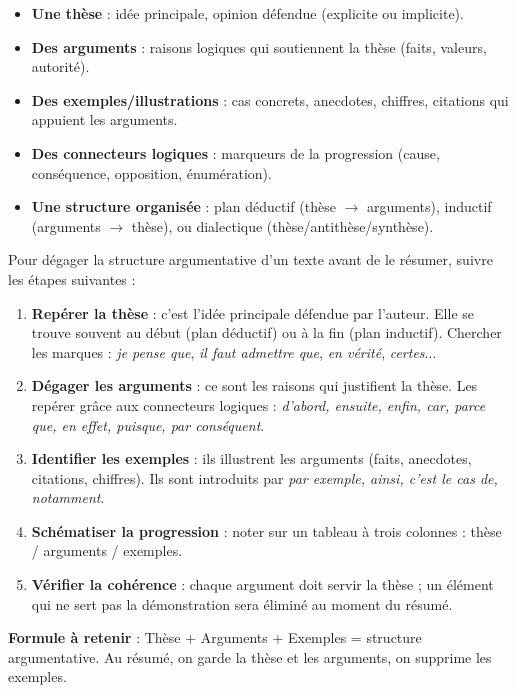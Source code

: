 \documentclass[11pt]{article}
\begin{document}
\begin{propriete}
\begin{itemize}
\item \textbf{Une thèse} : idée principale, opinion défendue (explicite ou implicite).
\item \textbf{Des arguments} : raisons logiques qui soutiennent la thèse (faits, valeurs, autorité).
\item \textbf{Des exemples/illustrations} : cas concrets, anecdotes, chiffres, citations qui appuient les arguments.
\item \textbf{Des connecteurs logiques} : marqueurs de la progression (cause, conséquence, opposition, énumération).
\item \textbf{Une structure organisée} : plan déductif (thèse $\rightarrow$ arguments), inductif (arguments $\rightarrow$ thèse), ou dialectique (thèse/antithèse/synthèse).
\end{itemize}
\end{propriete}

\begin{methode}
Pour dégager la structure argumentative d'un texte avant de le résumer, suivre les étapes suivantes :
\begin{enumerate}
\item \textbf{Repérer la thèse} : c'est l'idée principale défendue par l'auteur. Elle se trouve souvent au début (plan déductif) ou à la fin (plan inductif). Chercher les marques : \emph{je pense que}, \emph{il faut admettre que}, \emph{en vérité}, \emph{certes}...
\item \textbf{Dégager les arguments} : ce sont les raisons qui justifient la thèse. Les repérer grâce aux connecteurs logiques : \emph{d'abord, ensuite, enfin, car, parce que, en effet, puisque, par conséquent}.
\item \textbf{Identifier les exemples} : ils illustrent les arguments (faits, anecdotes, citations, chiffres). Ils sont introduits par \emph{par exemple, ainsi, c'est le cas de, notamment}.
\item \textbf{Schématiser la progression} : noter sur un tableau à trois colonnes : thèse / arguments / exemples.
\item \textbf{Vérifier la cohérence} : chaque argument doit servir la thèse ; un élément qui ne sert pas la démonstration sera éliminé au moment du résumé.
\end{enumerate}
\textbf{Formule à retenir} : Thèse + Arguments + Exemples = structure argumentative. Au résumé, on garde la thèse et les arguments, on supprime les exemples.
\end{methode}
\end{document}
